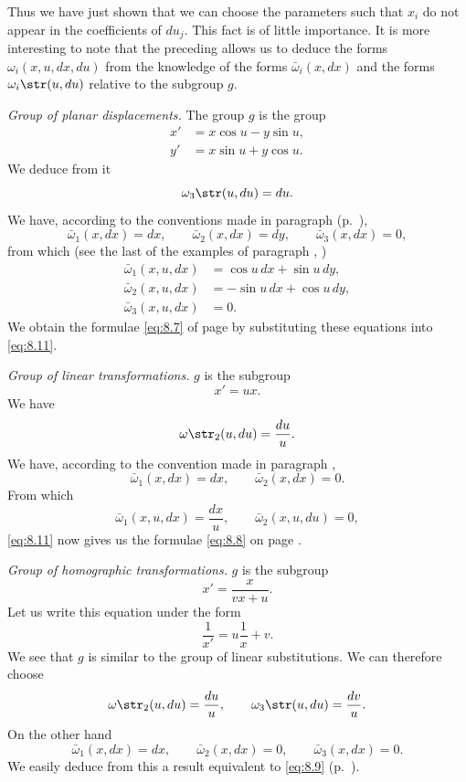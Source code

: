 {Thus we have just shown that we can choose the parameters such that $x_{i}$ do not appear in the coefficients of $du_{j}$. This fact is of little importance. It is more interesting to note that the preceding allows us to deduce the forms $\omega_{i}(x,u,dx,du)$ from the knowledge of the forms $\bar\omega_{i}(x,dx)$ and the forms $\omega_{i}\str(u,du)$ relative to the subgroup $g$.

\somespace

\emph{Group of planar displacements.} The group $g$ is the group
\begin{align*}
  x'&=x\cos u-y\sin u,\\
  y'&=x\sin u+y\cos u.
\end{align*}
We deduce from it
\[
\omega_{3}\str(u,du)=du.
\]
We have, according to the conventions made in paragraph  (p.~\pageref{sec:102}),
\[
\bar\omega_{1}(x,dx)=dx,\qquad\bar\omega_{2}(x,dx)=dy,\qquad\bar\omega_{3}(x,dx)=0,
\]
from which (see the last of the examples of paragraph , \pageref{sec:69})
\begin{align*}
  \bar\omega_{1}(x,u,dx)&=\cos u\,dx+\sin u\,dy,\\
  \bar\omega_{2}(x,u,dx)&=-\sin u\,dx+\cos u\,dy,\\
  \bar\omega_{3}(x,u,dx)&=0.
\end{align*}
We obtain the formulae \eqref{eq:8.7} of page \pageref{eq:8.7} by substituting these equations into \eqref{eq:8.11}.

\somespace

\emph{Group of linear transformations.} $g$ is the subgroup
\[x'=ux.\]
We have
\[
\omega\str_{2}(u,du)=\frac{du}{u}.
\]
We have, according to the convention made in paragraph ,
\[
\bar\omega_{1}(x,dx)=dx,\qquad\bar\omega_{2}(x,dx)=0.
\]
From which
\[
\bar\omega_{1}(x,u,dx)=\frac{dx}{u},\qquad\bar\omega_{2}(x,u,du)=0,
\]
\eqref{eq:8.11} now gives us the formulae \eqref{eq:8.8} on page \pageref{eq:8.8}.

\somespace

\emph{Group of homographic transformations.} $g$ is the subgroup
\[
x'=\frac{x}{vx+u}.
\]
Let us write this equation under the form
\[
\frac{1}{x'}=u\frac{1}{x}+v.
\]
We see that $g$ is similar to the group of linear substitutions. We can therefore choose
\[
\omega\str_{2}(u,du)=\frac{du}{u},\qquad\omega_{3}\str(u,du)=\frac{dv}{u}.
\]
On the other hand
\[
\bar\omega_{1}(x,dx)=dx,\qquad\bar\omega_{2}(x,dx)=0,\qquad\bar\omega_{3}(x,dx)=0.
\]
We easily deduce from this a result equivalent to \eqref{eq:8.9} (p.~\pageref{eq:8.9}).

}

